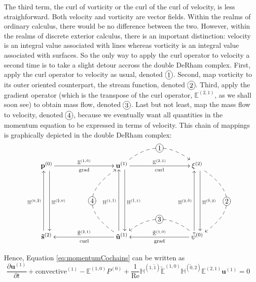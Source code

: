 The third term, the curl of vorticity or the curl of the curl of velocity, is less straighforward. Both velocity and vorticity are vector fields. Within the realms of ordinary calculus, there would be no difference between the two. However, within the realms of discrete exterior calculus, there is an important distinction: velocity is an integral value associated with lines whereas vorticity is an integral value associated with surfaces. So the only way to apply the curl operator to velocity a second time is to take a slight detour accross the double DeRham complex. First, apply the curl operator to velocity as usual, denoted $\xymatrix{*+[o][F-]{1}}$. Second, map vorticity to its outer oriented counterpart, the stream function, denoted $\xymatrix{*+[o][F-]{2}}$. Third, apply the gradient operator (which is the transpose of the curl operator, $\mathbb{E}^{(2,1)}$, as we shall soon see) to obtain mass flow, denoted $\xymatrix{*+[o][F-]{3}}$. Last but not least, map the mass flow to velocity, denoted $\xymatrix{*+[o][F-]{4}}$, because we eventually want all quantities in the momentum equation to be expressed in terms of velocity. This chain of mappings is graphically depicted in the double DeRham complex:
\begin{equation}
    \begin{gathered}
        \xymatrix@=20ex{
            \mathbf{p}^{(0)} \ar[r]^{\mathbb{E}^{(1,0)}}_{\text{grad}} \ar@<1ex>[d]^{\mathbb{H}^{(\tilde{2},0)}} & \mathbf{u}^{(1)} \ar[r]^{\mathbb{E}^{(2,1)}}_{\text{curl}} \ar @/^6ex/ @{-->} [r]|-*+[o][F-]{1} \ar@<1ex>[d]^{\mathbb{H}^{(\tilde{1},1)}} & \mathbf{\xi}^{(2)} \ar@<1ex>[d]^{\mathbb{H}^{(\tilde{0},2)}} \ar @/^10ex/ @{-->} [d]|-*+[o][F-]{2} \\
            \mathbf{\tilde{s}}^{(2)} \ar@<1ex>[u]^{\mathbb{H}^{(0,\tilde{2})}} & \mathbf{\tilde{u}}^{(1)} \ar[l]_{\tilde{\mathbb{E}}^{(2, 1)}}^{\text{curl}} \ar@<1ex>[u]^{\mathbb{H}^{(1,\tilde{1})}} \ar @/^10ex/ @{-->} [u]|-*+[o][F-]{4} & \mathbf{\tilde{\psi}}^{(0)} \ar[l]_{\tilde{\mathbb{E}}^{(1,0)}}^{\text{grad}} \ar @/_6ex/ @{-->} [l]|-*+[o][F-]{3} \ar@<1ex>[u]^{\mathbb{H}^{(2,\tilde{0})}}
        }
    \end{gathered}
\end{equation}

Hence, Equation \ref{eq:momentumCochains} can be written as
\begin{equation}
    \frac{\partial \mathbf{u}^{(1)}}{\partial t} + \text{convective}^{(1)} - \mathbb{E}^{(1,0)} P^{(0)} + \frac{1}{\text{Re}} \mathbb{H}^{(1,\tilde{1})} \tilde{\mathbb{E}}^{(1,0)} \mathbb{H}^{(\tilde{0},2)} \mathbb{E}^{(2,1)} \mathbf{u}^{(1)} = 0
\end{equation}

